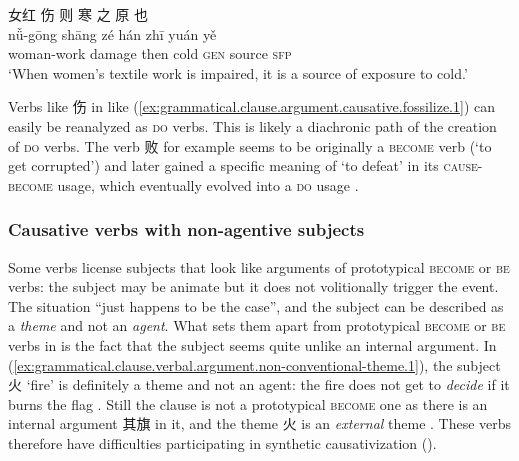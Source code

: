 \documentclass[UTF8, a4paper, oneside, scheme=plain, 12pt]{ctexrep}
\newcommand*{\citepage}[1]{p.~{#1}}
\newcommand*{\term}[1]{\emph{#1}}
\newcommand{\translate}[1]{`#1'}
\newcommand*{\category}[1]{\textsc{#1}}
\begin{document}
\begin{exe}
    \ex\label{ex:grammatical.clause.argument.causative.fossilize.1}
    \glll 女红 伤 则 寒 之 原 也 \\
    nǚ-gōng shāng zé hán zhī yuán yě \\
    woman-work damage then cold \category{gen} source \category{sfp} \\
    \glt\translate{When women's textile work is impaired, it is a source of exposure to cold.}
\end{exe}

Verbs like 伤 in like (\ref{ex:grammatical.clause.argument.causative.fossilize.1}) can easily be reanalyzed as \category{do} verbs.
This is likely a diachronic path of the creation of \category{do} verbs.
The verb 败 for example seems to be originally a \category{become} verb (\translate{to get corrupted})
and later gained a specific meaning of \translate{to defeat} in its \category{cause}-\category{become} usage,
which eventually evolved into a \category{do} usage
\citep[\citepage{285}]{meiguang2018}.

\subsubsection{Causative verbs with non-agentive subjects}
\label{sec:grammatical.clause.verbal.argument.simple.non-conventional-state}

Some verbs license subjects that look like arguments of prototypical \category{become} or \category{be} verbs:
the subject may be animate but it does not volitionally trigger the event.
The situation ``just happens to be the case'', and the subject can be described as a \term{theme} and not an \term{agent}.
What sets them apart from prototypical \category{become} or \category{be} verbs 
in 
is the fact that the subject seems quite unlike an internal argument.
In (\ref{ex:grammatical.clause.verbal.argument.non-conventional-theme.1}),
the subject 火 \translate{fire} is definitely a theme and not an agent:
the fire does not get to \emph{decide} if it burns the flag
\citep[\citepage{276}]{meiguang2018}.
Still the clause is not a prototypical \category{become} one
as there is an internal argument 其旗 in it,
and the theme 火 is an \emph{external} theme
\citep[\citepage{353}]{meiguang2018}.
These verbs therefore have difficulties participating in synthetic causativization
().
\end{document}
